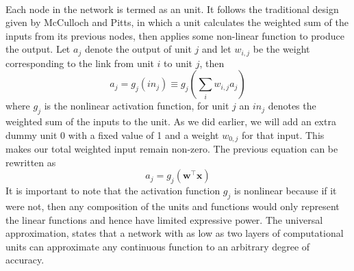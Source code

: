 \documentclass{article}
\begin{document}
      \paragraph{} Each node in the network is termed as an unit. It follows the traditional design given by McCulloch and Pitts, in which a unit calculates the weighted sum of the inputs from its previous nodes, then applies some non-linear function to produce the output. Let $a_j$ denote the output of unit $j$ and let $w_{i,j}$ be the weight corresponding to the link	from unit $i$ to unit $j$, then
      \begin{equation*}
        a_j = g_j (\textit{i} n_j) \equiv g_j ( \sum_i w_{i,j} a_j)
      \end{equation*}
      where $g_j$ is the nonlinear activation function, for unit $j$ an $\textit{i} n_j$ denotes the weighted sum of the inputs to the unit. As we did earlier, we will add an extra dummy unit 0 with a fixed value of 1 and a weight $w_{0,j}$ for that input. This makes our total weighted input remain non-zero. The previous equation can be rewritten as
      \begin{equation*}
        a_j = g_j (\mathbf{w}^{\top} \mathbf{x})
      \end{equation*}
      It is important to note that the activation function $g_j$ is nonlinear because if it were not, then any composition of the units and functions would only represent the linear functions and hence have limited expressive power. The universal approximation, states that a network with as low as two layers of computational units can approximate any continuous function to an arbitrary degree of accuracy.
\end{document}
